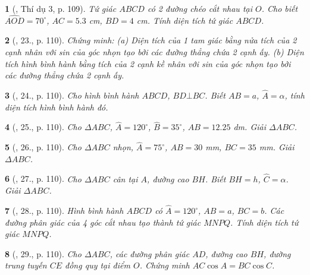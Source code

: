 \documentclass{article}
\newtheorem{baitoan}{}
\begin{document}
\begin{baitoan}[\cite{Tuyen_Toan_9_old}, Thí dụ 3, p. 109]
	Tứ giác $ABCD$ có 2 đường chéo cắt nhau tại $O$. Cho biết $\widehat{AOD} = 70^\circ$, $AC = 5.3$ \emph{cm}, $BD = 4$ \emph{cm}. Tính diện tích tứ giác $ABCD$.
\end{baitoan}

\begin{baitoan}[\cite{Tuyen_Toan_9_old}, 23., p. 110]
	Chứng minh: (a) Diện tích của 1 tam giác bằng nửa tích của 2 cạnh nhân với sin của góc nhọn tạo bởi các đường thẳng chứa 2 cạnh ấy. (b) Diện tích hình bình hành bằng tích của 2 cạnh kề nhân với sin của góc nhọn tạo bởi các đường thẳng chứa 2 cạnh ấy.
\end{baitoan}

\begin{baitoan}[\cite{Tuyen_Toan_9_old}, 24., p. 110]
	Cho hình bình hành $ABCD$, $BD\bot BC$. Biết $AB = a$, $\widehat{A} = \alpha$, tính diện tích hình bình hành đó.
\end{baitoan}

\begin{baitoan}[\cite{Tuyen_Toan_9_old}, 25., p. 110]
	Cho $\Delta ABC$, $\widehat{A} = 120^\circ$, $\widehat{B} = 35^\circ$, $AB = 12.25$ \emph{dm}. Giải $\Delta ABC$.
\end{baitoan}

\begin{baitoan}[\cite{Tuyen_Toan_9_old}, 26., p. 110]
	Cho $\Delta ABC$ nhọn, $\widehat{A} = 75^\circ$, $AB = 30$ \emph{mm}, $BC = 35$ \emph{mm}. Giải $\Delta ABC$.
\end{baitoan}

\begin{baitoan}[\cite{Tuyen_Toan_9_old}, 27., p. 110]
	Cho $\Delta ABC$ cân tại $A$, đường cao $BH$. Biết $BH = h$, $\widehat{C} = \alpha$. Giải $\Delta ABC$.
\end{baitoan}

\begin{baitoan}[\cite{Tuyen_Toan_9_old}, 28., p. 110]
	Hình bình hành $ABCD$ có $\widehat{A} = 120^\circ$, $AB = a$, $BC = b$. Các đường phân giác của 4 góc cắt nhau tạo thành tứ giác $MNPQ$. Tính diện tích tứ giác $MNPQ$.
\end{baitoan}

\begin{baitoan}[\cite{Tuyen_Toan_9_old}, 29., p. 110]
	Cho $\Delta ABC$, các đường phân giác $AD$, đường cao $BH$, đường trung tuyến $CE$ đồng quy tại điểm $O$. Chứng minh $AC\cos A = BC\cos C$.
\end{baitoan}
\end{document}

